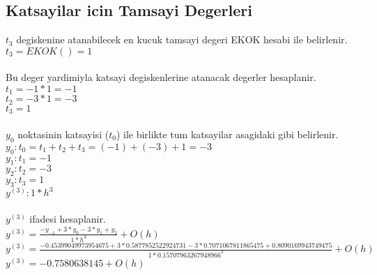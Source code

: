 \documentclass{article}
\begin{document}
\subsection{Katsayilar icin Tamsayi Degerleri}
$t_{3}$ degiskenine atanabilecek en kucuk tamsayi degeri EKOK hesabi ile belirlenir.\\
$t_{3}=EKOK()=1$\\
\\
Bu deger yardimiyla katsayi degiskenlerine atanacak degerler hesaplanir.\\
$\displaystyle t_{1}=-1*1=-1$\\
$\displaystyle t_{2}=-3*1=-3$\\
$\displaystyle t_{3}=1$\\
\\
$y_{0}$ noktasinin katsayisi ($t_{0}$) ile birlikte tum katsayilar asagidaki gibi belirlenir.\\
$y_{0}: t_{0}=t_{1}+t_{2}+t_{3}=(-1)+(-3)+1=-3$\\
$y_{1}: t_{1}=-1$\\
$y_{2}: t_{2}=-3$\\
$y_{3}: t_{3}=1$\\
$y^{(3)}: 1*h^3$\\
\\
$y^{(3)}$ ifadesi hesaplanir.\\
$y^{(3)}=\frac{-y_{-1}+3*y_{0}-3*y_{1}+y_{2}}{1*h^{3}}+O(h)$\\
$y^{(3)}=\frac{-0.45399049973954675+3*0.5877852522924731-3*0.7071067811865475+0.8090169943749475}{1*0.15707963267948966^{3}}+O(h)$\\
$y^{(3)}=-0.7580638145+O(h)$\\
\end{document}
